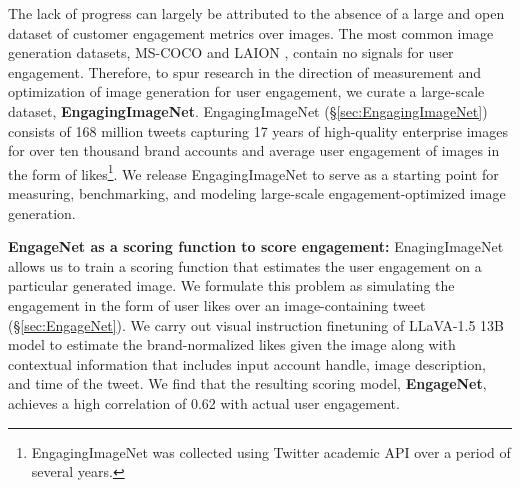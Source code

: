  The lack of progress can largely be attributed to the absence of a large and open dataset of customer engagement metrics over images. The most common image generation datasets, MS-COCO \cite{lin2014microsoft} and LAION \cite{schuhmann2022laion}, contain no signals for user engagement. 
 Therefore, to spur research in the direction of measurement and optimization of image generation for user engagement, we curate a large-scale dataset, \textbf{EngagingImageNet}. EngagingImageNet (\S\ref{sec:EngagingImageNet}) consists of 168 million tweets capturing 17 years of high-quality enterprise images for over ten thousand brand accounts and average user engagement of images in the form of likes\footnote{EngagingImageNet was collected using Twitter academic API over a period of several years.}. We release EngagingImageNet to serve as a starting point for measuring, benchmarking, and modeling large-scale engagement-optimized image generation. %
 
 
 
 
 \textbf{EngageNet as a scoring function to score engagement:} EnagingImageNet allows us to train a scoring function that estimates the user engagement on a particular generated image. We formulate this problem as simulating the engagement in the form of user likes over an image-containing tweet (\S\ref{sec:EngageNet}). We carry out visual instruction finetuning of LLaVA-1.5 13B \cite{liu2023visual} model to estimate the brand-normalized likes given the image along with contextual information that includes input account handle, image description, and time of the tweet. We find that the resulting scoring model, \textbf{EngageNet}, achieves a high correlation of 0.62 with actual user engagement. %
 

